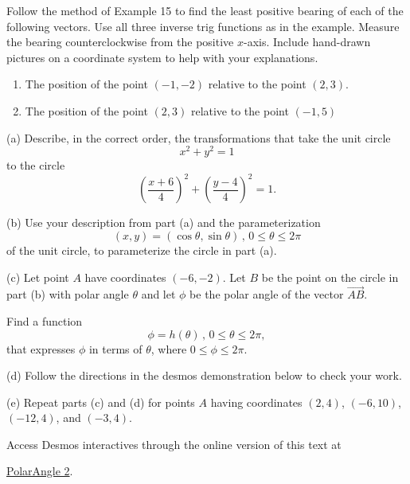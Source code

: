 \documentclass{ximera}
\begin{document}
\begin{question} \label{Q3rffem3}
Follow the method of Example 15 to find the least positive bearing of each of the following vectors. Use all three inverse trig functions as in the example. Measure the bearing counterclockwise from the positive $x$-axis. Include hand-drawn pictures on a coordinate system to help with your explanations.

\begin{enumerate}
\item The position of the point $(-1,-2)$ relative to the point $(2,3)$.

\item The position of the point $(2,3)$ relative to the point $(-1,5)$
\end{enumerate}


\end{question}



\begin{question} \label{Qdfthjimk}
(a) Describe, in the correct order, the transformations that take the unit circle
\[
  x^2 +y^2 = 1
\]
to the circle
\[
  \left( \frac{x+6}{4} \right)^2 +  \left( \frac{y-4}{4} \right)^2 = 1 .
\]

(b) Use your description from part (a) and the parameterization
\[
   ( x, y)  = ( \cos \theta , \sin\theta)  \, , \, 0\leq \theta \leq 2\pi
\]
of the unit circle, to parameterize the circle in part (a). 

(c) Let point $A$ have coordinates $(-6,-2)$. Let $B$ be the point on the circle in part (b) with polar angle $\theta$ and let
$\phi$ be the polar angle of the vector $\overrightarrow{AB}$.

Find a function
\[
  \phi = h(\theta) \, , \, 0\leq \theta \leq 2\pi ,
\]
that expresses $\phi$ in terms of $\theta$, where $0\leq \phi \leq 2\pi$.

(d) Follow the directions in the desmos demonstration below to check your work.

(e) Repeat parts (c) and (d) for points $A$ having coordinates $(2,4)$, $(-6,10)$, $(-12,4)$, and $(-3,4)$.  


\begin{onlineOnly}
    \begin{center}
\end{center}
\end{onlineOnly}


Access Desmos interactives through the online version of this text at
 
\href{https://www.desmos.com/calculator/7wverptnzm}{PolarAngle 2}.

\end{question}
\end{document}
